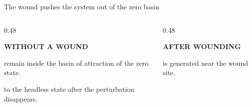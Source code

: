 




\begin{frame}{The wound pushes the system out of the zero basin}

  \vspace{0.18cm}

  \begin{columns}[c,onlytextwidth]

    \begin{column}{0.48\textwidth}

      {\color{HydraGold}\bfseries\fontsize{8}{9.5}\selectfont
        WITHOUT A WOUND\par}

      \vspace{0.22cm}

        {remain inside the basin of attraction of the zero state.}

      \vspace{0.08cm}

        {to the headless state after the perturbation disappears.}

    \end{column}

    \begin{column}{0.48\textwidth}

      {\color{HydraGold}\bfseries\fontsize{8}{9.5}\selectfont
        AFTER WOUNDING\par}

      \vspace{0.22cm}

        {is generated near the wound site.}

      \vspace{0.08cm}


\end{column}
\end{columns}
\end{frame}
